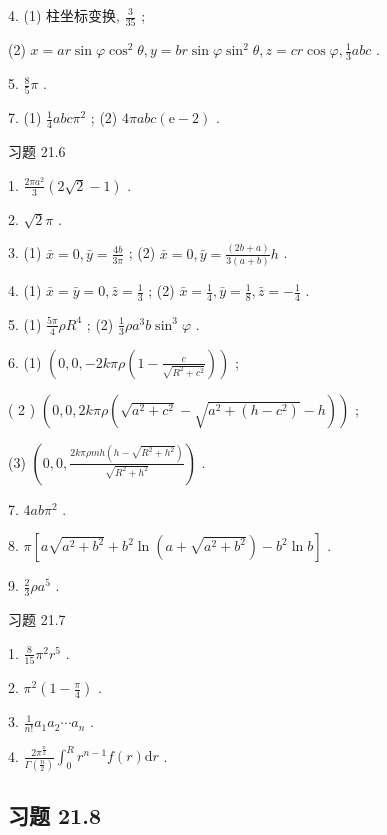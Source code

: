 4. (1) 柱坐标变换, \(\frac{3}{35}\) ;

(2) \(x = {ar}\sin \varphi {\cos }^{2}\theta ,y = {br}\sin \varphi {\sin }^{2}\theta ,z = {cr}\cos \varphi ,\frac{1}{3}{abc}\) .

5. \(\frac{8}{5}\pi\) .

7. (1) \(\frac{1}{4}{abc}{\pi }^{2}\) ; (2) \({4\pi abc}\left( {\mathrm{e} - 2}\right)\) .

习题 21.6

1. \(\frac{{2\pi }{a}^{2}}{3}\left( {2\sqrt{2} - 1}\right)\) .

2. \(\sqrt{2}\pi\) .

3. (1) \(\bar{x} = 0,\bar{y} = \frac{4b}{3\pi }\) ; (2) \(\bar{x} = 0,\bar{y} = \frac{\left( 2b + a\right) }{3\left( {a + b}\right) }h\) .

4. (1) \(\bar{x} = \bar{y} = 0,\bar{z} = \frac{1}{3}\) ; (2) \(\bar{x} = \frac{1}{4},\bar{y} = \frac{1}{8},\bar{z} =  - \frac{1}{4}\) .

5. (1) \(\frac{5\pi }{4}\rho {R}^{4}\) ; (2) \(\frac{1}{3}\rho {a}^{3}b{\sin }^{3}\varphi\) .

6. (1) \(\left( {0,0, - {2k\pi \rho }\left( {1 - \frac{c}{\sqrt{{R}^{2} + {c}^{2}}}}\right) }\right)\) ;

( 2 ) \(\left( {0,0,{2k\pi \rho }\left( {\sqrt{{a}^{2} + {c}^{2}} - \sqrt{{a}^{2} + \left( {h - {c}^{2}}\right) } - h}\right) }\right)\) ;

(3) \(\left( {0,0,\frac{{2k\pi \rho mh}\left( {h - \sqrt{{R}^{2} + {h}^{2}}}\right) }{\sqrt{{R}^{2} + {h}^{2}}}}\right)\) .

7. \({4ab}{\pi }^{2}\) .

8. \(\pi \left\lbrack  {a\sqrt{{a}^{2} + {b}^{2}} + {b}^{2}\ln \left( {a + \sqrt{{a}^{2} + {b}^{2}}}\right)  - {b}^{2}\ln b}\right\rbrack\) .

9. \(\frac{2}{3}\rho {a}^{5}\) .

习题 21.7

1. \(\frac{8}{15}{\pi }^{2}{r}^{5}\) .

2. \({\pi }^{2}\left( {1 - \frac{\pi }{4}}\right)\) .

3. \(\frac{1}{n!}{a}_{1}{a}_{2}\cdots {a}_{n}\) .

4. \(\frac{2{\pi }^{\frac{n}{2}}}{\Gamma \left( \frac{n}{2}\right) }{\int }_{0}^{R}{r}^{n - 1}f\left( r\right) \mathrm{d}r\) .

\subsection{习题 21.8}

